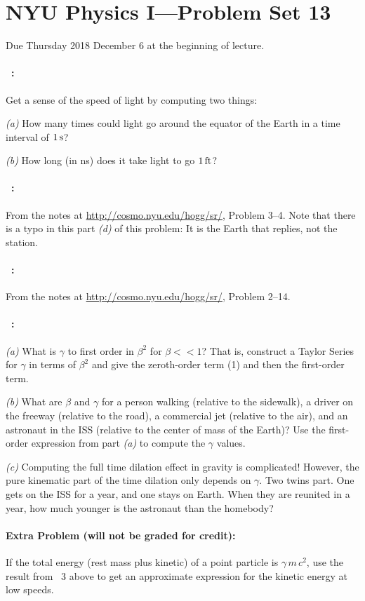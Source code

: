 \documentclass[12pt]{article}
\begin{document}
\section*{NYU Physics I---Problem Set 13}

Due Thursday 2018 December 6 at the beginning of lecture.

\paragraph{\problemname~\theproblem:}%
Get a sense of the speed of light by computing two things:

\textsl{(a)} How many times could light go around the equator of the Earth
in a time interval of $1\,\mathrm{s}$?

\textsl{(b)} How long (in ns) does it take light to go $1\,\mathrm{ft}$?

\paragraph{\problemname~\theproblem:}%
From the notes at \url{http://cosmo.nyu.edu/hogg/sr/},
Problem 3--4. Note that there is a typo in this part \textsl{(d)} of this
problem: It is the Earth that replies, not the station.

\paragraph{\problemname~\theproblem:}%
From the notes at \url{http://cosmo.nyu.edu/hogg/sr/},
Problem 2--14.

\paragraph{\problemname~\theproblem:}%
\textsl{(a)} What is $\gamma$ to first order in $\beta^2$ for $\beta
<< 1$? That is, construct a Taylor Series for $\gamma$ in terms of
$\beta^2$ and give the zeroth-order term (1) and then the first-order
term.

\textsl{(b)} What are $\beta$ and $\gamma$ for a person walking
(relative to the sidewalk), a driver on the freeway (relative to the
road), a commercial jet (relative to the air), and an astronaut in the
ISS (relative to the center of mass of the Earth)? Use the first-order
expression from part \textsl{(a)} to compute the $\gamma$ values.

\textsl{(c)} Computing the full time dilation effect in gravity is
complicated! However, the pure kinematic part of the time dilation
only depends on $\gamma$. Two twins part. One gets on the ISS for a
year, and one stays on Earth. When they are reunited in a year, how
much younger is the astronaut than the homebody?

\paragraph{Extra Problem (will not be graded for credit):}%
If the total energy (rest mass plus kinetic) of a point particle is
$\gamma\,m\,c^2$, use the result from \problemname~3 above to get an
approximate expression for the kinetic energy at low speeds.
\end{document}
